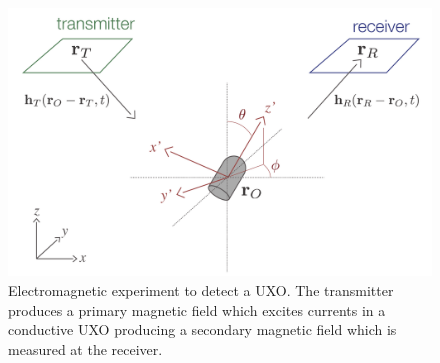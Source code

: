 \begin{figure}[htb]
\vspace{-0.1cm}
    \begin{center}
    \includegraphics[width=0.85\columnwidth]{figures/uxo-coordinates-01-01.png}
    \end{center}
    \vspace{-0.5cm}
\caption{
    Electromagnetic experiment to detect a UXO.
    The transmitter produces a primary magnetic field which excites
    currents in a conductive UXO producing a secondary magnetic field
    which is measured at the receiver.
}
\label{fig:uxo-coordinates}
\vspace{-0.1cm}
\end{figure}
